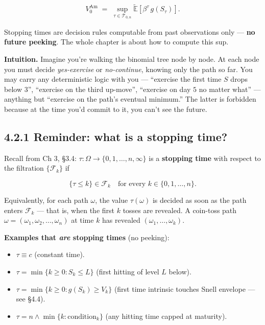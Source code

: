 \documentclass[
  10pt,
  twoside]{book}
\providecommand{\tightlist}{%
  \setlength{\itemsep}{0pt}\setlength{\parskip}{0pt}}
\begin{document}
\[V_0^{\text{Am}} \;=\; \sup_{\tau \in \mathcal{T}_{0,n}} \tilde{\mathbb{E}}\!\left[\beta^\tau\, g(S_\tau)\right].\]

Stopping times are decision rules computable from past observations only
--- \textbf{no future peeking}. The whole chapter is about how to
compute this sup.

\textbf{Intuition.} Imagine you're walking the binomial tree node by
node. At each node you must decide \emph{yes-exercise} or
\emph{no-continue}, knowing only the path so far. You may carry any
deterministic logic with you --- ``exercise the first time \(S\) drops
below \(3\)'', ``exercise on the third up-move'', ``exercise on day
\(5\) no matter what'' --- anything but ``exercise on the path's
eventual minimum.'' The latter is forbidden because at the time you'd
commit to it, you can't see the future.

\subsection{4.2.1 Reminder: what is a stopping
time?}\label{reminder-what-is-a-stopping-time}

Recall from Ch 3, §3.4: \(\tau: \Omega \to \{0, 1, \dots, n, \infty\}\)
is a \textbf{stopping time} with respect to the filtration
\(\{\mathcal F_k\}\) if

\[\{\tau \le k\} \in \mathcal F_k \quad \text{for every } k \in \{0, 1, \dots, n\}.\]

Equivalently, for each path \(\omega\), the value \(\tau(\omega)\) is
decided as soon as the path enters \(\mathcal F_k\) --- that is, when
the first \(k\) tosses are revealed. A coin-toss path
\(\omega = (\omega_1, \omega_2, \dots, \omega_n)\) at time \(k\) has
revealed \((\omega_1, \dots, \omega_k)\).

\textbf{Examples that \emph{are} stopping times} (no peeking):

\begin{itemize}
\tightlist
\item
  \(\tau \equiv c\) (constant time).
\item
  \(\tau = \min\{k \ge 0 : S_k \le L\}\) (first hitting of level \(L\)
  below).
\item
  \(\tau = \min\{k \ge 0 : g(S_k) \ge V_k\}\) (first time intrinsic
  touches Snell envelope --- see §4.4).
\item
  \(\tau = n \wedge \min\{k : \text{condition}_k\}\) (any hitting time
  capped at maturity).
\end{itemize}
\end{document}
